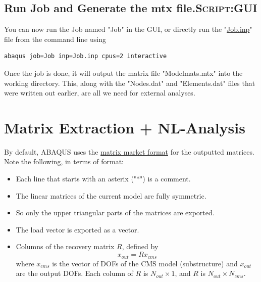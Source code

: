 \documentclass[11pt]{article}
\begin{document}
\subsection{Run Job and Generate the mtx file.\hfill{}\textsc{Script:GUI}}
\label{sec:orgae703c3}
You can now run the Job named "Job" in the GUI, or directly run the "\href{https://github.com/Nidish96/Abaqus4Joints/blob/main/assets/demo/Job.inp}{Job.inp}" file from the command line using
\begin{verbatim}
abaqus job=Job inp=Job.inp cpus=2 interactive
\end{verbatim}
Once the job is done, it will output the matrix file "Modelmats.mtx" into the working directory.
This, along with the "Nodes.dat" and "Elements.dat" files that were written out earlier, are all we need for external analyses.
\pagebreak
\section{Matrix Extraction + NL-Analysis}
\label{sec:mex}
By default, ABAQUS uses the \href{https://math.nist.gov/MatrixMarket/}{matrix market format} for the outputted matrices.
Note the following, in terms of format:
\begin{itemize}
\item Each line that starts with an asterix ("*") is a comment.
\item The linear matrices of the current model are fully symmetric.
\item So only the upper triangular parts of the matrices are exported.
\item The load vector is exported as a vector.
\item Columns of the recovery matrix \(R\), defined by
$$ x_{out} = R x_{cms} $$
where \(x_{cms}\) is the vector of DOFs of the CMS model (substructure) and \(x_{out}\) are the output DOFs.
Each column of \(R\) is \(N_{out}\times 1\), and \(R\) is \(N_{out}\times N_{cms}\).
\end{itemize}
\end{document}
